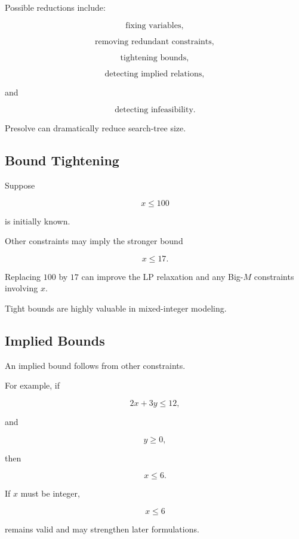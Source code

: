 Possible reductions include:

\[
\boxed{
\text{fixing variables},
}
\]

\[
\boxed{
\text{removing redundant constraints},
}
\]

\[
\boxed{
\text{tightening bounds},
}
\]

\[
\boxed{
\text{detecting implied relations},
}
\]

and

\[
\boxed{
\text{detecting infeasibility}.
}
\]

Presolve can dramatically reduce search-tree size.

\subsection{Bound Tightening}
\label{subsec:integer-bound-tightening}

Suppose

\[
x\leq100
\]

is initially known.

Other constraints may imply the stronger bound

\[
x\leq17.
\]

Replacing \(100\) by \(17\) can improve the LP relaxation and any Big-\(M\)
constraints involving \(x\).

Tight bounds are highly valuable in mixed-integer modeling.

\subsection{Implied Bounds}
\label{subsec:implied-bounds}

An implied bound follows from other constraints.

For example, if

\[
2x+3y\leq12,
\]

and

\[
y\geq0,
\]

then

\[
\boxed{
x\leq6.
}
\]

If \(x\) must be integer,

\[
\boxed{
x\leq6
}
\]

remains valid and may strengthen later formulations.

